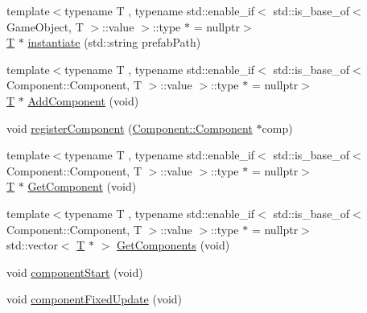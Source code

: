 \begin{DoxyCompactItemize}
\item 
{\footnotesize template$<$typename T , typename std\+::enable\+\_\+if$<$ std\+::is\+\_\+base\+\_\+of$<$ Game\+Object, T $>$\+::value $>$\+::type $\ast$  = nullptr$>$ }\\\mbox{\hyperlink{namespace_beer_engine_a94f0b552f6dc910de8cdb44207981f53a8de48e594408f9fc561b2f68ce05f664}{T}} $\ast$ \mbox{\hyperlink{class_beer_engine_1_1_game_object_ad523cd5783c0bfda02a9077af646e25b}{instantiate}} (std\+::string prefab\+Path)
\item 
{\footnotesize template$<$typename T , typename std\+::enable\+\_\+if$<$ std\+::is\+\_\+base\+\_\+of$<$ Component\+::\+Component, T $>$\+::value $>$\+::type $\ast$  = nullptr$>$ }\\\mbox{\hyperlink{namespace_beer_engine_a94f0b552f6dc910de8cdb44207981f53a8de48e594408f9fc561b2f68ce05f664}{T}} $\ast$ \mbox{\hyperlink{class_beer_engine_1_1_game_object_a62e1af180bc3c2cd12c06153ac06aa3a}{Add\+Component}} (void)
\item 
void \mbox{\hyperlink{class_beer_engine_1_1_game_object_a1454d7ec7fc8d98d621ae9be166976e4}{register\+Component}} (\mbox{\hyperlink{class_beer_engine_1_1_component_1_1_component}{Component\+::\+Component}} $\ast$comp)
\item 
{\footnotesize template$<$typename T , typename std\+::enable\+\_\+if$<$ std\+::is\+\_\+base\+\_\+of$<$ Component\+::\+Component, T $>$\+::value $>$\+::type $\ast$  = nullptr$>$ }\\\mbox{\hyperlink{namespace_beer_engine_a94f0b552f6dc910de8cdb44207981f53a8de48e594408f9fc561b2f68ce05f664}{T}} $\ast$ \mbox{\hyperlink{class_beer_engine_1_1_game_object_a70a24bb3e511f2ff0488b80c65e88f9f}{Get\+Component}} (void)
\item 
{\footnotesize template$<$typename T , typename std\+::enable\+\_\+if$<$ std\+::is\+\_\+base\+\_\+of$<$ Component\+::\+Component, T $>$\+::value $>$\+::type $\ast$  = nullptr$>$ }\\std\+::vector$<$ \mbox{\hyperlink{namespace_beer_engine_a94f0b552f6dc910de8cdb44207981f53a8de48e594408f9fc561b2f68ce05f664}{T}} $\ast$ $>$ \mbox{\hyperlink{class_beer_engine_1_1_game_object_acab5c2fff0115dcc68ce12c051d254a7}{Get\+Components}} (void)
\item 
void \mbox{\hyperlink{class_beer_engine_1_1_game_object_a2770f244f916ffc2dcb1885f0f30f66d}{component\+Start}} (void)
\item 
void \mbox{\hyperlink{class_beer_engine_1_1_game_object_a50b9ea3bbd7fa155f5ab4b4b1da52b7a}{component\+Fixed\+Update}} (void)

\end{DoxyCompactItemize}
